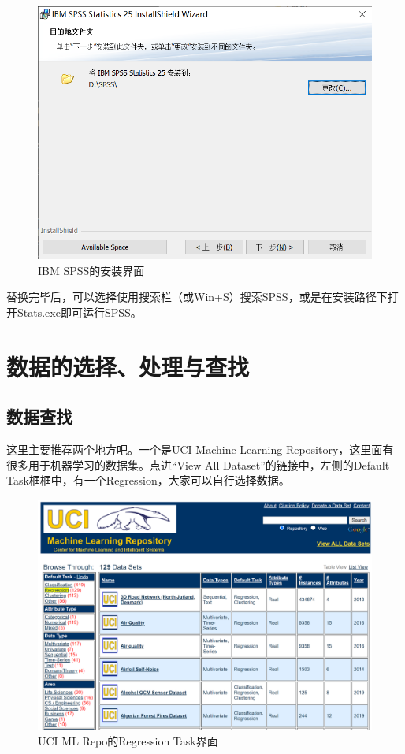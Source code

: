 \documentclass[10pt, a4paper]{article}
\begin{document}
\begin{figure}[H]
    \centering
    \includegraphics[width=0.7\linewidth]{SPSS.png}
    \caption{IBM SPSS的安装界面}
    \label{fig:SPSS}
\end{figure}

替换完毕后，可以选择使用搜索栏（或Win+S）搜索SPSS，或是在安装路径下打开Stats.exe即可运行SPSS。

\section{数据的选择、处理与查找}

\subsection{数据查找}
这里主要推荐两个地方吧。一个是\href{https://archive.ics.uci.edu/ml/index.php}{UCI Machine Learning Repository}，这里面有很多用于机器学习的数据集。点进“View All Dataset”的链接中，左侧的Default Task框框中，有一个Regression，大家可以自行选择数据。
\begin{figure}[H]
    \centering
    \includegraphics[width=0.7\linewidth]{UCI.png}
    \caption{UCI ML Repo的Regression Task界面}
    \label{fig:UCI}
\end{figure}
\end{document}
